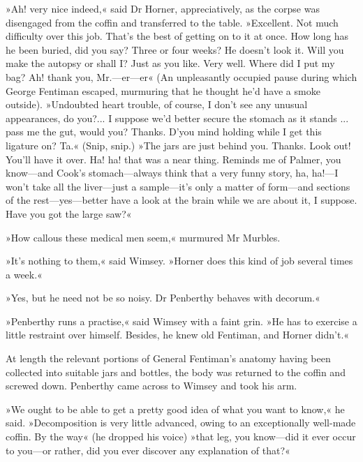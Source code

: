 »Ah! very nice indeed,« said Dr Horner, appreciatively, as the corpse was disengaged from the coffin and transferred to the table. »Excellent. Not much difficulty over this job. That's the best of getting on to it at once. How long has he been buried, did you say? Three or four weeks? He doesn't look it. Will you make the autopsy or shall I? Just as you like. Very well. Where did I put my bag? Ah! thank you, Mr.---er\allowbreak---\allowbreak er\longdash« (An unpleasantly occupied pause during which George Fentiman escaped, murmuring that he thought he'd have a smoke outside). »Undoubted heart trouble, of course, I don't see any unusual appearances, do you?... I suppose we'd better secure the stomach as it stands ... pass me the gut, would you? Thanks. D'you mind holding while I get this ligature on? Ta.« (Snip, snip.) »The jars are just behind you. Thanks. Look out! You'll have it over. Ha! ha! that was a near thing. Reminds me of Palmer, you know\allowbreak---\allowbreak and Cook's stomach\allowbreak---\allowbreak always think that a very funny story, ha, ha!---I won't take all the liver\allowbreak---\allowbreak just a sample\allowbreak---\allowbreak it's only a matter of form\allowbreak---\allowbreak and sections of the rest\allowbreak---\allowbreak yes---better have a look at the brain while we are about it, I suppose. Have you got the large saw?«

»How callous these medical men seem,« murmured Mr Murbles.

»It's nothing to them,« said Wimsey. »Horner does this kind of job several times a week.«

»Yes, but he need not be so noisy. Dr Penberthy behaves with decorum.«

»Penberthy runs a practise,« said Wimsey with a faint grin. »He has to exercise a little restraint over himself. Besides, he knew old Fentiman, and Horner didn't.«

At length the relevant portions of General Fentiman's anatomy having been collected into suitable jars and bottles, the body was returned to the coffin and screwed down. Penberthy came across to Wimsey and took his arm.

»We ought to be able to get a pretty good idea of what you want to know,« he said. »Decomposition is very little advanced, owing to an exceptionally well-made coffin. By the way« (he dropped his voice) »that leg, you know\allowbreak---\allowbreak did it ever occur to you\allowbreak---\allowbreak or rather, did you ever discover any explanation of that?«

